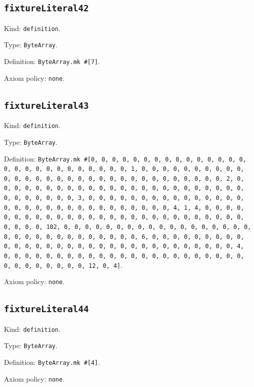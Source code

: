 \documentclass[11pt]{article}
\begin{document}
\subsection*{\texttt{fixtureLiteral42}}
\noindent Kind: \texttt{definition}.\par
\noindent Type: \texttt{ByteArray}.\par
\noindent Definition: \texttt{ByteArray.mk \#[7]}.\par
\noindent Axiom policy: \texttt{none}.\par
\subsection*{\texttt{fixtureLiteral43}}
\noindent Kind: \texttt{definition}.\par
\noindent Type: \texttt{ByteArray}.\par
\noindent Definition: \texttt{ByteArray.mk \#[0, 0, 0, 0, 0, 0, 0, 0, 0, 0, 0, 0, 0, 0, 0, 0, 0, 0, 0, 0, 0, 0, 0, 0, 0, 0, 0, 1, 0, 0, 0, 0, 0, 0, 0, 0, 0, 0, 0, 0, 0, 0, 0, 0, 0, 0, 0, 0, 0, 0, 0, 0, 0, 0, 0, 0, 0, 0, 0, 2, 0, 0, 0, 0, 0, 0, 0, 0, 0, 0, 0, 0, 0, 0, 0, 0, 0, 0, 0, 0, 0, 0, 0, 0, 0, 0, 0, 0, 0, 0, 0, 3, 0, 0, 0, 0, 0, 0, 0, 0, 0, 0, 0, 0, 0, 0, 0, 0, 0, 0, 0, 0, 0, 0, 0, 0, 0, 0, 0, 0, 0, 0, 0, 4, 1, 4, 0, 0, 0, 0, 0, 0, 0, 0, 0, 0, 0, 0, 0, 0, 0, 0, 0, 0, 0, 0, 0, 0, 0, 0, 0, 0, 0, 0, 0, 0, 0, 102, 0, 0, 0, 0, 0, 0, 0, 0, 0, 0, 0, 0, 0, 0, 0, 0, 0, 0, 0, 0, 0, 0, 0, 0, 0, 0, 0, 0, 0, 0, 0, 6, 0, 0, 0, 0, 0, 0, 0, 0, 0, 0, 0, 0, 0, 0, 0, 0, 0, 0, 0, 0, 0, 0, 0, 0, 0, 0, 0, 0, 0, 0, 0, 4, 0, 0, 0, 0, 0, 0, 0, 0, 0, 0, 0, 0, 0, 0, 0, 0, 0, 0, 0, 0, 0, 0, 0, 0, 0, 0, 0, 0, 0, 0, 0, 12, 0, 4]}.\par
\noindent Axiom policy: \texttt{none}.\par
\subsection*{\texttt{fixtureLiteral44}}
\noindent Kind: \texttt{definition}.\par
\noindent Type: \texttt{ByteArray}.\par
\noindent Definition: \texttt{ByteArray.mk \#[4]}.\par
\noindent Axiom policy: \texttt{none}.\par
\end{document}
